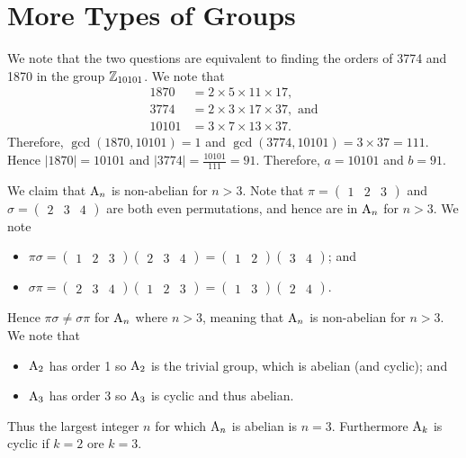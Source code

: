 \section{More Types of Groups}
\begin{questions}    
    \item We note that the two questions are equivalent to finding the orders of 3774 and 1870 in the group $\mathbb{Z}_{10101}$. We note that
    \begin{align*}
        1870 &= 2 \times 5 \times 11 \times 17,\\
        3774 &= 2 \times 3 \times 17 \times 37, \text{ and}\\
        10101 &= 3 \times 7 \times 13 \times 37.
    \end{align*}
    Therefore, $\gcd(1870, 10101) = 1$ and $\gcd(3774, 10101) = 3 \times 37 = 111$. Hence $|1870| = 10101$ and $|3774| = \frac{10101}{111} = 91$. Therefore, $a = 10101$ and $b = 91$.

    \item We claim that $\mathrm{A}_{n}$ is non-abelian for $n > 3$. Note that $\pi = \begin{pmatrix}1 & 2 & 3\end{pmatrix}$ and $\sigma = \begin{pmatrix}2 & 3 & 4\end{pmatrix}$ are both even permutations, and hence are in $\mathrm{A}_{n}$ for $n > 3$. We note
    \begin{itemize}
        \item $\pi\sigma = \begin{pmatrix}1 & 2 & 3\end{pmatrix}\begin{pmatrix}2 & 3 & 4\end{pmatrix} = \begin{pmatrix}1 & 2\end{pmatrix}\begin{pmatrix}3 & 4\end{pmatrix}$; and
        \item $\sigma\pi = \begin{pmatrix}2 & 3 & 4\end{pmatrix}\begin{pmatrix}1 & 2 & 3\end{pmatrix} = \begin{pmatrix}1 & 3\end{pmatrix}\begin{pmatrix}2 & 4\end{pmatrix}$.
    \end{itemize}
    Hence $\pi\sigma \neq \sigma\pi$ for $\mathrm{A}_{n}$ where $n > 3$, meaning that $\mathrm{A}_{n}$ is non-abelian for $n > 3$. We note that
    \begin{itemize}
        \item $\mathrm{A}_{2}$ has order 1 so $\mathrm{A}_{2}$ is the trivial group, which is abelian (and cyclic); and
        \item $\mathrm{A}_{3}$ has order 3 so $\mathrm{A}_{3}$ is cyclic and thus abelian.
    \end{itemize}
    Thus the largest integer $n$ for which $\mathrm{A}_{n}$ is abelian is $n = 3$. Furthermore $\mathrm{A}_{k}$ is cyclic if $k = 2$ ore $k = 3$.
    

\end{questions}
